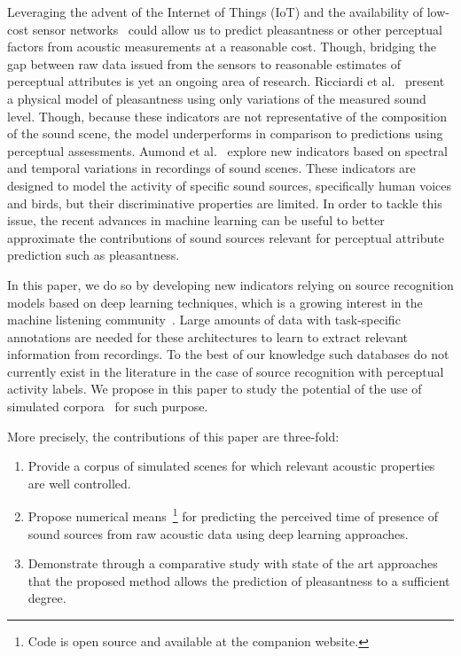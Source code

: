 \documentclass[11pt,a4paper]{article}
\begin{document}
Leveraging the advent of the Internet of Things (IoT) and the availability of low-cost sensor networks~\cite{ardouin2018, mydlarz2017} could allow us to predict pleasantness or other perceptual factors from acoustic measurements at a reasonable cost. Though, bridging the gap between raw data issued from the sensors to reasonable estimates of perceptual attributes is yet an ongoing area of research. Ricciardi et al.~\cite{ricciardi2014} present a physical model of pleasantness using only variations of the measured sound level. Though, because these indicators are not representative of the composition of the sound scene, the model underperforms in comparison to predictions using perceptual assessments. Aumond et al.~\cite{aumond2017} explore new indicators based on spectral and temporal variations in recordings of sound scenes. These indicators are designed to model the activity of specific sound sources, specifically human voices and birds, but their discriminative properties are limited. In order to tackle this issue, the recent advances in machine learning can be useful to better approximate the contributions of sound sources relevant for perceptual attribute prediction such as pleasantness.

In this paper, we do so by developing new indicators relying on source recognition models based on deep learning techniques, which is a growing interest in the machine listening community~\cite{cakir2015, salamon2017-2}. Large amounts of data with task-specific annotations are needed for these architectures to learn to extract relevant information from recordings. To the best of our knowledge such databases do not currently exist in the literature in the case of source recognition with perceptual activity labels. We propose in this paper to study the potential of the use of simulated corpora~\cite{rossignol2015, salamon2017} for such purpose.

More precisely, the contributions of this paper are three-fold:
\begin{enumerate}
  \item Provide a corpus of simulated scenes for which relevant acoustic properties are well controlled.
  \item Propose numerical means~\footnote{Code is open source and available at the companion website.} for predicting the perceived time of presence of sound sources from raw acoustic data using deep learning approaches.
  \item Demonstrate through a comparative study with state of the art approaches that the proposed method allows the prediction of pleasantness to a sufficient degree.
\end{enumerate}
\end{document}
